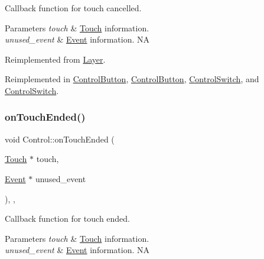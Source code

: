 Callback function for touch cancelled.


\begin{DoxyParams}{Parameters}
{\em touch} & \hyperlink{classTouch}{Touch} information. \\
\hline
{\em unused\+\_\+event} & \hyperlink{classEvent}{Event} information.  NA \\
\hline
\end{DoxyParams}


Reimplemented from \hyperlink{classLayer_a9254f82e75c109b81c392d415ecf7b3d}{Layer}.



Reimplemented in \hyperlink{classControlButton_a32a7a37982d52d6660b532adabb8099e}{Control\+Button}, \hyperlink{classControlButton_a95558febae1ea6790245d093766ba20e}{Control\+Button}, \hyperlink{classControlSwitch_a31cc47f044081bb65d8490ac1b8900c0}{Control\+Switch}, and \hyperlink{classControlSwitch_aa4c6a2f3766e9916f0619a0249ddd7d7}{Control\+Switch}.

\mbox{\label{classControl_a56073e57060169fe80cbb6ce1f4abe28}} 
\subsubsection{\texorpdfstring{on\+Touch\+Ended()}{onTouchEnded()}\hspace{0.1cm}{\footnotesize\ttfamily [1/2]}}
{\footnotesize\ttfamily void Control\+::on\+Touch\+Ended (\begin{DoxyParamCaption}\item[{\hyperlink{classTouch}{Touch} $\ast$}]{touch,  }\item[{\hyperlink{classEvent}{Event} $\ast$}]{unused\+\_\+event }\end{DoxyParamCaption})\hspace{0.3cm}{\ttfamily [inline]}, {\ttfamily [override]}, {\ttfamily [virtual]}}

Callback function for touch ended.


\begin{DoxyParams}{Parameters}
{\em touch} & \hyperlink{classTouch}{Touch} information. \\
\hline
{\em unused\+\_\+event} & \hyperlink{classEvent}{Event} information.  NA \\
\hline
\end{DoxyParams}



